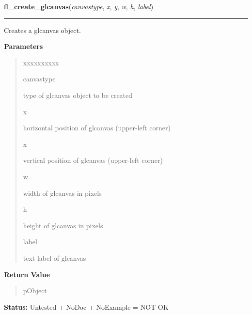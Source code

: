 \hspace{.8\funcindent}\begin{boxedminipage}{\funcwidth}

    \raggedright \textbf{fl\_create\_glcanvas}(\textit{canvastype}, \textit{x}, \textit{y}, \textit{w}, \textit{h}, \textit{label})

    \vspace{-1.5ex}

    \rule{\textwidth}{0.5\fboxrule}
\setlength{\parskip}{2ex}
    Creates a glcanvas object.

\setlength{\parskip}{1ex}
      \textbf{Parameters}
      \vspace{-1ex}

      \begin{quote}
        \begin{Ventry}{xxxxxxxxxx}

          \item[canvastype]

          type of glcanvas object to be created

          \item[x]

          horizontal position of glcanvas (upper-left corner)

          \item[x]

          vertical position of glcanvas (upper-left corner)

          \item[w]

          width of glcanvas in pixels

          \item[h]

          height of glcanvas in pixels

          \item[label]

          text label of glcanvas

        \end{Ventry}

      \end{quote}

      \textbf{Return Value}
    \vspace{-1ex}

      \begin{quote}
      pObject

      \end{quote}

\textbf{Status:} Untested + NoDoc + NoExample = NOT OK



    \end{boxedminipage}

